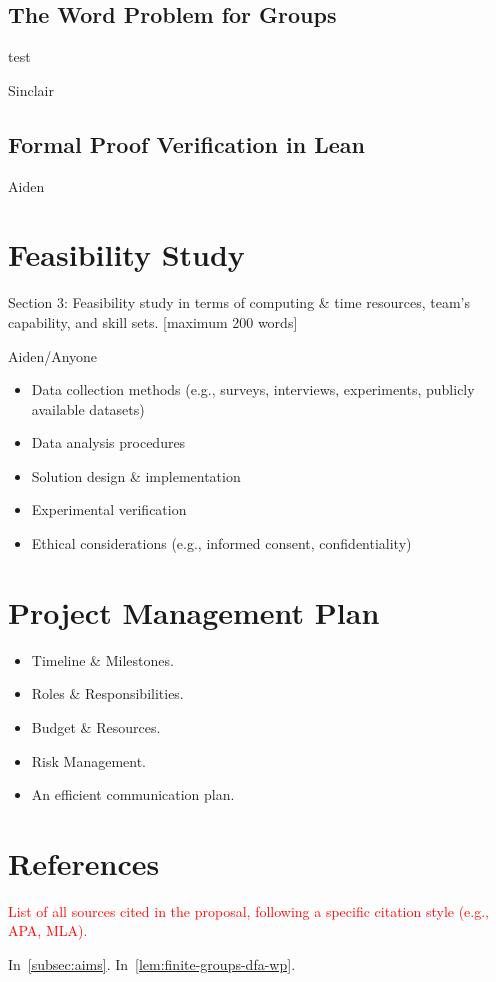 \documentclass[12pt]{article}
\begin{document}
\subsection{The Word Problem for Groups}\label{subsec:word-problem}

\begin{lemma}\label{lem:finite-groups-dfa-wp}
test
\end{lemma}
Sinclair
\subsection{Formal Proof Verification in Lean}
Aiden


\section{Feasibility Study}
Section 3: Feasibility study in terms of computing \& time resources, team’s capability, and skill sets. [maximum 200 words]
\newline

Aiden/Anyone
\begin{itemize}
    \item Data collection methods (e.g., surveys, interviews, experiments, publicly available datasets)
    \item Data analysis procedures
    \item Solution design \& implementation
    \item Experimental verification
    \item Ethical considerations (e.g., informed consent, confidentiality)
\end{itemize}


\section{Project Management Plan}


\begin{itemize}
    \item Timeline \& Milestones.
    \item Roles \& Responsibilities.
    \item Budget \& Resources.
    \item Risk Management.
    \item An efficient communication plan.
\end{itemize}

\section{References}

\textcolor{red}{List of all sources cited in the proposal, following a specific citation style (e.g., APA, MLA).}

In~\cref{subsec:aims}. In~\cref{lem:finite-groups-dfa-wp}. 

\end{document}
